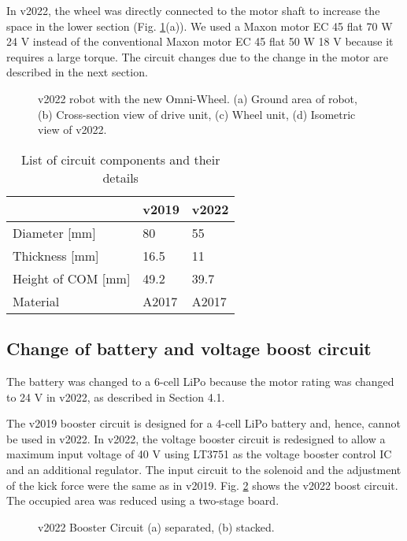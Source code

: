 \documentclass[]{llncs}
\begin{document}
In v2022, the wheel was directly connected to the motor shaft to increase the space in the lower section (Fig. \ref{fig:robot2021}(a)).
%
We used a Maxon motor EC 45 flat 70 W 24 V instead of the conventional Maxon motor EC 45 flat 50 W 18 V because it requires a large torque.
%
The circuit changes due to the change in the motor are described in the next section.
%
\begin{figure}[htbp]
    \centering
     \quad
    \caption{v2022 robot with the new Omni-Wheel. (a) Ground area of robot, (b) Cross-section view of drive unit, (c) Wheel unit, (d) Isometric view of v2022.}
    \label{fig:robot2021}
\end{figure}
%
\begin{table}[htbp]
\centering
\caption{List of circuit components and their details}
\label{tab:v2019v2022}
\begin{tabularx}{\linewidth}{X|X|X}
\hline
 & v2019 & v2022 \\\hline
 Diameter [mm] & 80 & 55 \\
 Thickness [mm] & 16.5 & 11 \\
 Height of COM [mm] & 49.2 & 39.7 \\
 Material & A2017 & A2017 \\
\hline
\end{tabularx}
\end{table}


\subsection{Change of battery and voltage boost circuit}
%
The battery was changed to a 6-cell LiPo because the motor rating was changed to 24 V in v2022, as described in Section 4.1. 
%

The v2019 booster circuit is designed for a 4-cell LiPo battery and, hence, cannot be used in v2022.
%
In v2022, the voltage booster circuit is redesigned to allow a maximum input voltage of 40 V using LT3751 as the voltage booster control IC and an additional regulator.
%
The input circuit to the solenoid and the adjustment of the kick force were the same as in v2019. Fig. \ref{fig:booster2021} shows the v2022 boost circuit.
%
The occupied area was reduced using a two-stage board.
%
\begin{figure}[htbp]
    \centering
    \caption{v2022 Booster Circuit (a) separated, (b) stacked.}
    \label{fig:booster2021}
\end{figure}
\end{document}
